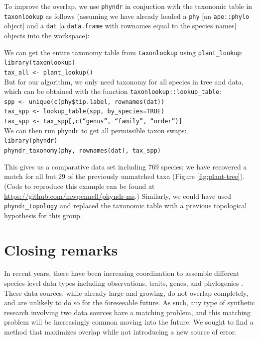 \documentclass[a4paper,11pt]{article}
\newcommand{\phyndr}{\tt phyndr}
\newcommand{\taxonlookup}{\tt taxonlookup}
\begin{document}
To improve the overlap, we use {\phyndr} in conjuction with the taxonomic table in {\taxonlookup} as follows (assuming we have already loaded a \texttt{phy} [an \texttt{ape::phylo} object] and a \texttt{dat} [a \texttt{data.frame} with rownames equal to the species names] objects into the workspace):
\begin{flushleft}
We can get the entire taxonomy table from {\taxonlookup} using \texttt{plant\_lookup}:\\
\texttt{library(taxonlookup)}\\
\texttt{tax\_all <- plant\_lookup()}\\
\bigskip
But for our algorithm, we only need taxonomy for all species in tree and data, which can be obtained with the function \texttt{taxonlookup::lookup\_table}:\\
\texttt{spp <- unique(c(phy\$tip.label, rownames(dat))}\\
\texttt{tax\_spp <- lookup\_table(spp, by\_species=TRUE)}\\
\texttt{tax\_spp <- tax\_spp[,c(``genus'', ``family'', ``order'')]}\\
\bigskip
We can then run {\phyndr} to get all permissible taxon swaps:\\
\texttt{library(phyndr)}\\
\texttt{phyndr\_taxonomy(phy, rownames(dat), tax\_spp)}\\

\end{flushleft}
This gives us a comparative data set including 769 species; we have recovered a match for all but 29 of the previously unmatched taxa (Figure \ref{fig:plant-tree}). (Code to reproduce this example can be found at \url{https://github.com/mwpennell/phyndr-ms}.) Similarly, we could have used \texttt{phyndr\_topology} and replaced the taxonomic table with a previous topological hypothesis for this group.


\section{Closing remarks}

In recent years, there have been increasing coordination to assemble different species-level data types including observations, traits, genes, and phylogenies \citep{Parr2012}.  These data sources, while already large and growing, do not overlap completely, and are unlikely to do so for the foreseeable future.  As such, any type of synthetic research involving two data sources have a matching problem, and this matching problem will be increasingly common moving into the future.  We sought to find a method that maximizes overlap while not introducing a new source of error.
\end{document}

